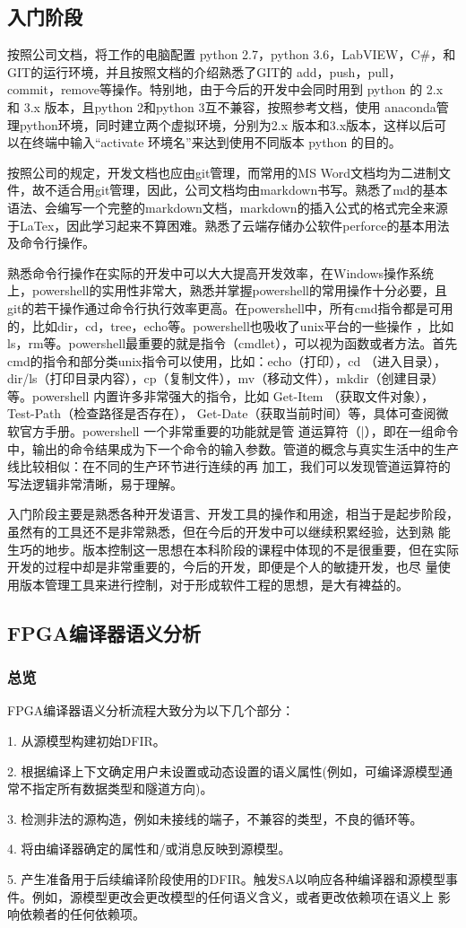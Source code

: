 \documentclass[UTF8]{ctexart}
\begin{document}
\subsection{入门阶段}
按照公司文档，将工作的电脑配置 python 2.7，python 3.6，LabVIEW，C\#，和GIT的运行环境，并且按照文档的介绍熟悉了GIT的 add，push，pull，
commit，remove等操作。特别地，由于今后的开发中会同时用到 python 的 2.x 和 3.x 版本，且python 2和python 3互不兼容，按照参考文档，使用 
anaconda管理python环境，同时建立两个虚拟环境，分别为2.x 版本和3.x版本，这样以后可以在终端中输入“activate 环境名”来达到使用不同版本 python
的目的。
\par
按照公司的规定，开发文档也应由git管理，而常用的MS Word文档均为二进制文件，故不适合用git管理，因此，公司文档均由markdown书写。熟悉了md的基本
语法、会编写一个完整的markdown文档，markdown的插入公式的格式完全来源于LaTex，因此学习起来不算困难。熟悉了云端存储办公软件perforce的基本用法
及命令行操作。
\par
熟悉命令行操作在实际的开发中可以大大提高开发效率，在Windows操作系统上，powershell的实用性非常大，熟悉并掌握powershell的常用操作十分必要，且
git的若干操作通过命令行执行效率更高。在powershell中，所有cmd指令都是可用的，比如dir，cd，tree，echo等。powershell也吸收了unix平台的一些操作
，比如ls，rm等。powershell最重要的就是指令（cmdlet），可以视为函数或者方法。首先cmd的指令和部分类unix指令可以使用，比如：echo（打印），cd
（进入目录），dir/ls（打印目录内容），cp（复制文件），mv（移动文件），mkdir（创建目录）等。powershell 内置许多非常强大的指令，比如 Get-Item
（获取文件对象）， Test-Path（检查路径是否存在）， Get-Date（获取当前时间）等，具体可查阅微软官方手册。powershell 一个非常重要的功能就是管
道运算符（|），即在一组命令中，输出的命令结果成为下一个命令的输入参数。管道的概念与真实生活中的生产线比较相似：在不同的生产环节进行连续的再
加工，我们可以发现管道运算符的写法逻辑非常清晰，易于理解。
\par
入门阶段主要是熟悉各种开发语言、开发工具的操作和用途，相当于是起步阶段，虽然有的工具还不是非常熟悉，但在今后的开发中可以继续积累经验，达到熟
能生巧的地步。版本控制这一思想在本科阶段的课程中体现的不是很重要，但在实际开发的过程中却是非常重要的，今后的开发，即便是个人的敏捷开发，也尽
量使用版本管理工具来进行控制，对于形成软件工程的思想，是大有裨益的。

\subsection{FPGA编译器语义分析}
\subsubsection{总览}
FPGA编译器语义分析流程大致分为以下几个部分：
\par
1. 从源模型构建初始DFIR。
\par
2. 根据编译上下文确定用户未设置或动态设置的语义属性(例如，可编译源模型通常不指定所有数据类型和隧道方向)。
\par
3. 检测非法的源构造，例如未接线的端子，不兼容的类型，不良的循环等。
\par
4. 将由编译器确定的属性和/或消息反映到源模型。
\par
5. 产生准备用于后续编译阶段使用的DFIR。触发SA以响应各种编译器和源模型事件。例如，源模型更改会更改模型的任何语义含义，或者更改依赖项在语义上
影响依赖者的任何依赖项。
\end{document}
